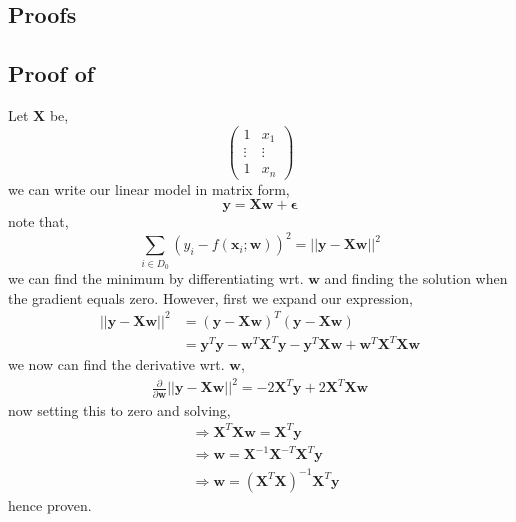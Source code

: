 \begin{appendices}


\section{Proofs}

\subsection{Proof of } \label{proof:wLS solution}
Let $\bm{X}$ be,
\begin{equation}
    \begin{pmatrix}
        1 & x_{1}\\
        \vdots & \vdots \\
        1 & x_{n}
    \end{pmatrix}
\end{equation}
we can write our linear model in matrix form,
\begin{equation}
    \bm{y} = \bm{Xw} + \bm{\epsilon}
\end{equation}
note that,
\begin{equation}
    \sum_{i \in D_{0}} (y_{i} - f(\bm{x}_{i};\bm{w}))^{2}
    = || \bm{y} - \bm{Xw}||^{2}
\end{equation}
we can find the minimum by differentiating wrt. $\bm{w}$ and finding the solution when the gradient equals zero. However, first we expand our expression,
\begin{align}
    || \bm{y} - \bm{Xw}||^{2} 
    {}& = (\bm{y} - \bm{Xw})^{T} (\bm{y}-\bm{Xw}) \\ 
    & = \bm{y}^{T}\bm{y} - \bm{w}^{T} \bm{X}^{T} \bm{y} - \bm{y}^{T}\bm{Xw} + \bm{w}^{T} \bm{X}^{T} \bm{Xw}
\end{align}
we now can find the derivative wrt. $\bm{w}$,
\begin{align}
    \frac{\partial}{\partial \bm{w}} ||\bm{y} - \bm{Xw}||^{2} = -2 \bm{X}^{T} \bm{y} + 2 \bm{X}^{T} \bm{X} \bm{w}
\end{align}
now setting this to zero and solving,
\begin{align}
    {}&\Rightarrow \bm{X}^{T} \bm{X} \bm{w} = \bm{X}^{T} \bm{y} \\
    & \Rightarrow \bm{w} = \bm{X}^{-1} \bm{X}^{-T} \bm{X}^{T} \bm{y} \\
    & \Rightarrow \bm{w} = (\bm{X}^{T} \bm{X})^{-1} \bm{X}^{T} \bm{y}
\end{align}
hence proven.


\end{appendices}

